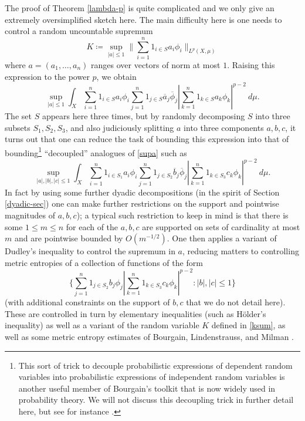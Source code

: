 \documentclass[12pt,a4paper,reqno]{amsart}
\numberwithin{equation}{section}
\theoremstyle{plain}
\theoremstyle{definition}
\begin{document}
The proof of Theorem \ref{lambda-p} is quite complicated and we only give an extremely oversimplified sketch here.  The main difficulty here is one needs to control a random uncountable supremum
\begin{equation}\label{ksum}
 K \coloneqq \sup_{|a| \leq 1} \| \sum_{i=1}^n 1_{i \in S} a_i \phi_i \|_{L^p(X,\mu)} 
\end{equation}
where $a = (a_1,\dots,a_n)$ ranges over vectors of norm at most $1$. Raising this expression to the power $p$, we obtain 
\begin{equation}\label{supa}
 \sup_{|a| \leq 1} \int_X \sum_{i=1}^n 1_{i \in S} a_i \phi_i \sum_{j=1}^n 1_{j \in S} \overline{a}_j \overline{\phi}_j |\sum_{k=1}^n 1_{k \in S} a_k \phi_k|^{p-2}\ d\mu.
\end{equation}
The set $S$ appears here three times, but by randomly decomposing $S$ into three subsets $S_1,S_2,S_3$, and also judiciously splitting $a$ into three components $a,b,c$, it turns out that one can reduce the task of bounding this expression into that of bounding\footnote{This sort of trick to decouple probabilistic expressions of dependent random variables into probabilistic expressions of independent random variables is another useful member of Bourgain's toolkit that is now widely used in probability theory.  We will not discuss this decoupling trick in further detail here, but see for instance \cite{pena}.} ``decoupled'' analogues of \eqref{supa} such as
$$ \sup_{|a|,|b|,|c| \leq 1} \int_X \sum_{i=1}^n 1_{i \in S_1} a_i \phi_i \sum_{j=1}^n 1_{j \in S_2} \overline{b}_j \overline{\phi}_j |\sum_{k=1}^n 1_{k \in S_3} c_k \phi_k|^{p-2}\ d\mu.$$
In fact by using some further dyadic decompositions (in the spirit of Section \ref{dyadic-sec}) one can make further restrictions on the support and pointwise magnitudes of $a,b,c$); a typical such restriction to keep in mind is that there is some $1 \leq m \leq n$ for each of the $a,b,c$ are supported on sets of cardinality at most $m$ and are pointwise bounded by $O(m^{-1/2})$.  One then applies a variant of Dudley's inequality to control the supremum in $a$, reducing matters to controlling metric entropies of a collection of functions of the form
$$ \{ \sum_{j=1}^n 1_{j \in S_2} b_j \phi_j |\sum_{k=1}^n 1_{k \in S_3} c_k \phi_k|^{p-2}: |b|, |c| \leq 1 \}$$
(with additional constraints on the support of $b,c$ that we do not detail here).  These are controlled in turn by elementary inequalities (such as H\"older's inequality) as well as a variant of the random variable $K$ defined in \eqref{ksum}, as well as some metric entropy estimates of Bourgain, Lindenstrauss, and Milman \cite{zonotopes}.
\end{document}
